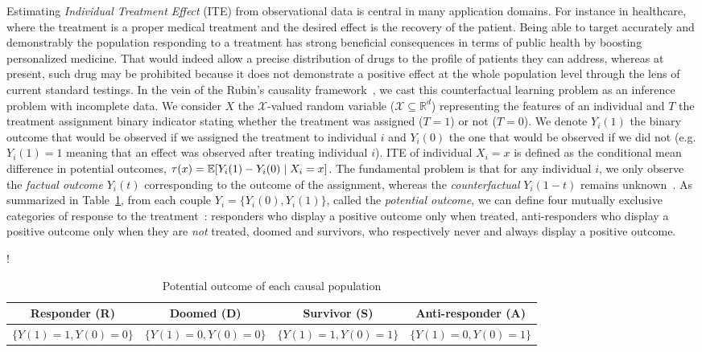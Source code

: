 Estimating \emph{Individual Treatment Effect} (ITE) from observational data is central in many application domains. For instance in healthcare, where the treatment is a proper medical treatment and the desired effect is the recovery of the patient. Being able to target accurately and demonstrably the population responding to a treatment has strong beneficial consequences in terms of public health by boosting personalized medicine. That would indeed allow a precise distribution of drugs to the profile of patients they can address, whereas at present, such drug may be prohibited because it does not demonstrate a positive effect at the whole population level through the lens of current standard testings.
In the vein of the Rubin's causality framework~\cite{Rubin_1974,Imbens1997}, we cast this counterfactual learning problem as an inference problem with incomplete data. We consider $X$ the $\mathcal{X}$-valued random variable ($\mathcal{X}\subseteq {\mathbb{R}}^d$) representing the features of an individual and $T$ the treatment assignment binary indicator stating whether the treatment was assigned ($T=1$) or not ($T=0$).
We denote $Y_i(1)$ the binary outcome that would be observed if we assigned the treatment to individual $i$ and $Y_i(0)$ the one that would be observed if we did not (e.g. $Y_i(1) = 1$ meaning that an effect was observed after treating individual $i$).
ITE of individual $X_i=x$ is defined as the conditional mean difference in potential outcomes,
$\tau(x)=\mathbb{E}[Y_i(1)-Y_i(0)\mid X_i=x]$.
The fundamental problem is that for any individual $i$, we only observe the \emph{factual outcome} $Y_i(t)$ corresponding to the outcome of the assignment, whereas the \emph{counterfactual} $Y_i(1-t)$ remains unknown~\cite{Imbens1997}.
As summarized in Table~\ref{tab:Behaviors-probabilities}, from each couple $Y_i=\{Y_i(0),Y_i(1)\}$, called the \emph{potential outcome}, we can define four mutually exclusive categories of response to the treatment~\cite{Wasserman2004}:
responders who display a positive outcome only when treated, anti-responders who display a positive outcome only when they are \emph{not} treated, doomed and survivors, who respectively never and always display a positive outcome. 

 \begin{table}[!ht]
  \centering
\resizebox {12cm} {!} {
\begin{tabular}{ c | c  |c  |c }
  Responder (R) & Doomed (D)  & Survivor (S) & Anti-responder (A) \\
 \hline 
 $\{Y(1)=1,Y(0)=0\}$ & $\{Y(1)=0,Y(0)=0\}$ & $\{Y(1)=1,Y(0)=1\}$ & $\{Y(1)=0,Y(0)=1\}$ \\
\end{tabular}
    }
\caption{Potential outcome of each causal population 
}
 \label{tab:Behaviors-probabilities}
\end{table}


